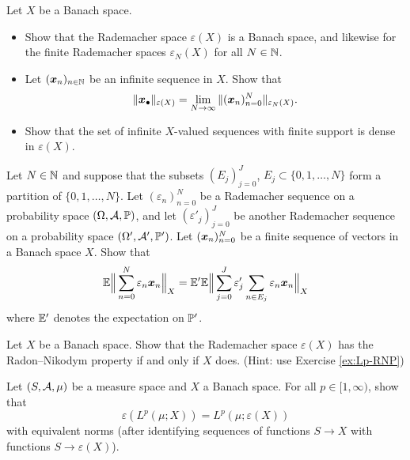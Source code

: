 \begin{exercise}\label{ex:on-rad-spaces}
  Let $X$ be a Banach space.
  \begin{itemize}
  \item
    Show that the Rademacher space $\varepsilon(X)$ is a Banach space, and likewise for the finite Rademacher spaces $\varepsilon_{N}(X)$ for all $N \in \N$.
  \item
    Let $(\mb{x}_{n})_{n \in \N}$ be an infinite sequence in $X$.
    Show that
    \begin{equation*}
      \|\mb{x}_{\bullet}\|_{\varepsilon(X)} = \lim_{N \to \infty} \|(\mb{x}_{n})_{n=0}^{N}\|_{\varepsilon_{N}(X)}.
    \end{equation*}
  \item
    Show that the set of infinite $X$-valued sequences with finite support is dense in $\varepsilon(X)$.
  \end{itemize}
\end{exercise}

\begin{exercise}
  Let $N \in \N$ and suppose that the subsets $(E_{j})_{j=0}^{J}$, $E_{j} \subset \{0,1,\ldots,N\}$ form a partition of $\{0,1,\ldots,N\}$.
  Let $(\varepsilon_{n})_{n=0}^{N}$ be a Rademacher sequence on a probability space $(\Omega,\mc{A},\P)$, and let $(\varepsilon'_{j})_{j=0}^{J}$ be another Rademacher sequence on a probability space $(\Omega', \mc{A}', \P')$.
  Let $(\mb{x}_{n})_{n=0}^{N}$ be a finite sequence of vectors in a Banach space $X$.
  Show that
  \begin{equation*}
    \E \Big\| \sum_{n=0}^{N} \varepsilon_{n} \mb{x}_{n} \Big\|_{X} = \E' \E \Big\| \sum_{j=0}^{J} \varepsilon'_{j} \sum_{n \in E_{j}} \varepsilon_{n} \mb{x}_{n} \Big\|_{X}
  \end{equation*}
  where $\E'$ denotes the expectation on $\P'$.
\end{exercise}

\begin{exercise}
  Let $X$ be a Banach space.
  Show that the Rademacher space $\varepsilon(X)$ has the Radon--Nikodym property if and only if $X$ does. (Hint: use Exercise \ref{ex:Lp-RNP})
\end{exercise}

\begin{exercise}
  Let $(S,\mc{A},\mu)$ be a measure space and $X$ a Banach space.
  For all $p \in [1,\infty)$, show that
  \begin{equation*}
    \varepsilon(L^{p}(\mu;X)) = L^{p}(\mu;\varepsilon(X))
  \end{equation*}
  with equivalent norms (after identifying sequences of functions $S \to X$ with functions $S \to \varepsilon(X)$). 
\end{exercise}

